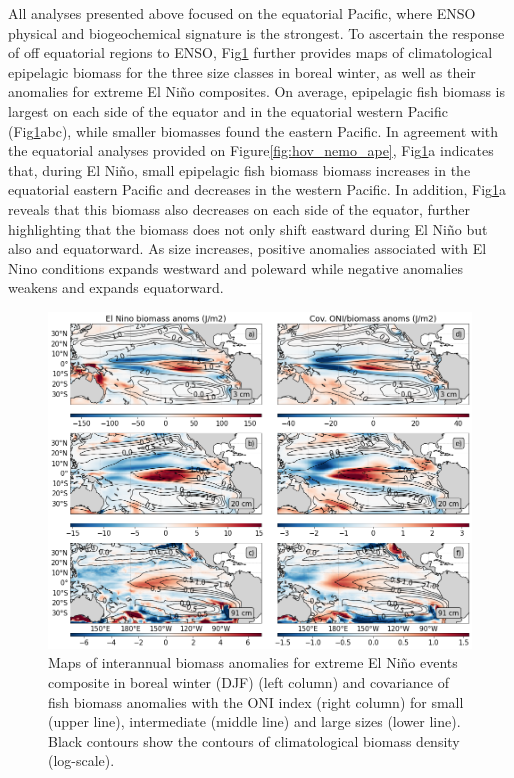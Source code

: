 All analyses presented above focused on the equatorial Pacific, where ENSO physical and biogeochemical signature is the strongest. To ascertain the response of off equatorial regions to ENSO,  Fig\ref{fig:mean_ond97_ape} further provides maps of climatological epipelagic biomass for the three size classes in boreal winter, as well as their anomalies for extreme El Niño composites.  On average, epipelagic fish biomass is largest on each side of the equator and in the equatorial western Pacific (Fig\ref{fig:mean_ond97_ape}abc), while smaller biomasses  found the eastern Pacific. In agreement with the equatorial analyses provided on Figure\ref{fig:hov_nemo_ape}, Fig\ref{fig:mean_ond97_ape}a indicates that, during El Niño, small epipelagic fish biomass biomass increases in the equatorial eastern Pacific and decreases in the western Pacific. In addition, Fig\ref{fig:mean_ond97_ape}a reveals that this biomass also decreases on each side of the equator, further highlighting that the biomass does not only shift eastward during El Niño but also and equatorward.
As size increases, positive anomalies associated with El Nino conditions expands westward and poleward while negative anomalies weakens and expands equatorward. 

\begin{figure}[h!tp]
	\centering
	\includegraphics[scale=0.4]{figs/map_mean_anom_OND_97.png}	
	\caption{Maps of interannual biomass anomalies for extreme El Niño events composite in boreal winter (DJF) (left column) and covariance of fish biomass anomalies with the ONI index (right column) for small (upper line), intermediate (middle line) and large sizes (lower line). Black contours show the contours of climatological biomass density (log-scale).}	
	\label{fig:mean_ond97_ape}
\end{figure}


